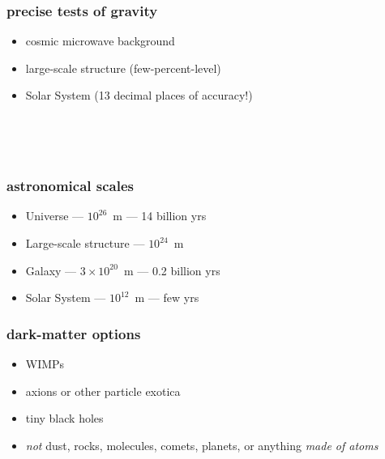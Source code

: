 \documentclass{beamer}
\begin{document}
\begin{frame}
\frametitle{precise tests of gravity}
\begin{itemize}
\item cosmic microwave background
\item large-scale structure (few-percent-level)
\item Solar System (13 decimal places of accuracy!)
\end{itemize}
\end{frame}

{\begin{frame}[plain]~\end{frame}}

{\begin{frame}[plain]~\end{frame}}

\begin{frame}
\frametitle{astronomical scales}
\begin{itemize}
\item Universe --- $10^{26}$~m --- 14 billion yrs
\item Large-scale structure --- $10^{24}$~m
\item Galaxy --- $3\times 10^{20}$~m --- 0.2 billion yrs
\item Solar System --- $10^{12}$~m --- few yrs
\end{itemize}
\end{frame}

\begin{frame}
\frametitle{dark-matter options}
\begin{itemize}
\item WIMPs
\item axions or other particle exotica
\item tiny black holes
\item \emph{not} dust, rocks, molecules, comets, planets, or anything \emph{made of atoms}
\end{itemize}
\end{frame}

{\begin{frame}[plain]~\end{frame}}

{\begin{frame}[plain]~\end{frame}}
\end{document}
